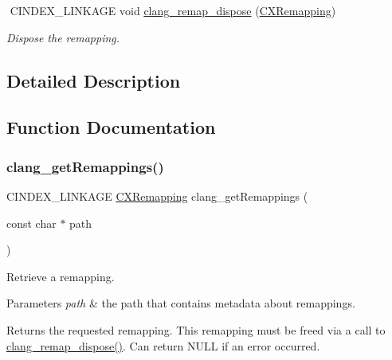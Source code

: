 \begin{DoxyCompactItemize}
$$\mbox{\label{group__CINDEX__REMAPPING_gafbd34560f59e5d3e0f5e746215b12ed7}} 
C\+I\+N\+D\+E\+X\+\_\+\+L\+I\+N\+K\+A\+GE void \mbox{\hyperlink{group__CINDEX__REMAPPING_gafbd34560f59e5d3e0f5e746215b12ed7}{clang\+\_\+remap\+\_\+dispose}} (\mbox{\hyperlink{group__CINDEX__REMAPPING_ga04be0aca9e36a130cf1dd6fd8cbd4408}{C\+X\+Remapping}})
\begin{DoxyCompactList}\small\item\em Dispose the remapping. \end{DoxyCompactList}\end{DoxyCompactItemize}


\subsection{Detailed Description}


\subsection{Function Documentation}
\mbox{\label{group__CINDEX__REMAPPING_ga6388687c77b68fb0e83a393a91625c7f}} 
\subsubsection{\texorpdfstring{clang\+\_\+get\+Remappings()}{clang\_getRemappings()}}
{\footnotesize\ttfamily C\+I\+N\+D\+E\+X\+\_\+\+L\+I\+N\+K\+A\+GE \mbox{\hyperlink{group__CINDEX__REMAPPING_ga04be0aca9e36a130cf1dd6fd8cbd4408}{C\+X\+Remapping}} clang\+\_\+get\+Remappings (\begin{DoxyParamCaption}\item[{const char $\ast$}]{path }\end{DoxyParamCaption})}



Retrieve a remapping. 


\begin{DoxyParams}{Parameters}
{\em path} & the path that contains metadata about remappings.\\
\hline
\end{DoxyParams}
\begin{DoxyReturn}{Returns}
the requested remapping. This remapping must be freed via a call to {\ttfamily \mbox{\hyperlink{group__CINDEX__REMAPPING_gafbd34560f59e5d3e0f5e746215b12ed7}{clang\+\_\+remap\+\_\+dispose()}}}. Can return N\+U\+LL if an error occurred. 
\end{DoxyReturn}
\mbox{\label{group__CINDEX__REMAPPING_gadc19460a19f4f0d3ab8b722dca75b047}} 
